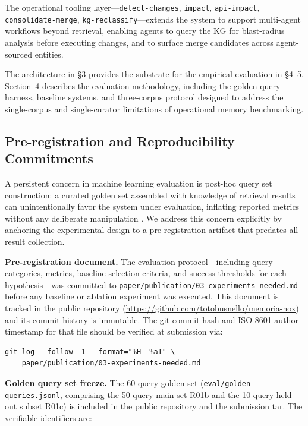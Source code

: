 The operational tooling layer---\texttt{detect-changes}, \texttt{impact},
\texttt{api-impact}, \texttt{consolidate-merge}, \texttt{kg-reclassify}---extends the
system to support multi-agent workflows beyond retrieval, enabling agents to query the KG
for blast-radius analysis before executing changes, and to surface merge candidates across
agent-sourced entities.

The architecture in \S3 provides the substrate for the empirical evaluation in \S4--5.
Section~4 describes the evaluation methodology, including the golden query harness,
baseline systems, and three-corpus protocol designed to address the single-corpus and
single-curator limitations of operational memory benchmarking.

\FloatBarrier
\subsection{Pre-registration and Reproducibility Commitments}

A persistent concern in machine learning evaluation is post-hoc query set construction:
a curated golden set assembled with knowledge of retrieval results can unintentionally
favor the system under evaluation, inflating reported metrics without any deliberate
manipulation \cite{munafosystematic2017}. We address this concern explicitly by anchoring
the experimental design to a pre-registration artifact that predates all result collection.

\textbf{Pre-registration document.} The evaluation protocol---including query categories,
metrics, baseline selection criteria, and success thresholds for each
hypothesis---was committed to \texttt{paper/publication/03-experiments-needed.md} before
any baseline or ablation experiment was executed. This document is tracked in the public
repository (\url{https://github.com/totobusnello/memoria-nox}) and its commit history is
immutable. The git commit hash and ISO-8601 author timestamp for that file should be
verified at submission via:

\medskip
\begin{verbatim}
git log --follow -1 --format="%H  %aI" \
    paper/publication/03-experiments-needed.md
\end{verbatim}
\medskip

\textbf{Golden query set freeze.} The 60-query golden set (\texttt{eval/golden-queries.jsonl},
comprising the 50-query main set R01b and the 10-query held-out subset R01c) is included
in the public repository and the submission tar. The verifiable identifiers are:

